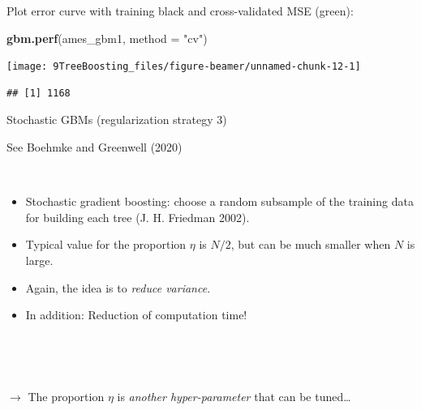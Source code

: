 \documentclass[
  10pt,
  ignorenonframetext,
]{beamer}
\newenvironment{Shaded}{\begin{snugshade}}{\end{snugshade}}
\newcommand{\AttributeTok}[1]{\textcolor[rgb]{0.13,0.29,0.53}{#1}}
\newcommand{\FunctionTok}[1]{\textcolor[rgb]{0.13,0.29,0.53}{\textbf{#1}}}
\newcommand{\NormalTok}[1]{#1}
\newcommand{\StringTok}[1]{\textcolor[rgb]{0.31,0.60,0.02}{#1}}
\providecommand{\tightlist}{%
  \setlength{\itemsep}{0pt}\setlength{\parskip}{0pt}}
\begin{document}
\begin{frame}[fragile]
Plot error curve with training black and cross-validated MSE (green):

\vspace{2mm}

\scriptsize

\begin{Shaded}
\begin{Highlighting}[]
\FunctionTok{gbm.perf}\NormalTok{(ames\_gbm1, }\AttributeTok{method =} \StringTok{"cv"}\NormalTok{)}
\end{Highlighting}
\end{Shaded}

\begin{center}\texttt{[image: 9TreeBoosting\_files/figure-beamer/unnamed-chunk-12-1]} \end{center}

\begin{verbatim}
## [1] 1168
\end{verbatim}
\end{frame}

\begin{frame}
\begin{block}{Stochastic GBMs (regularization strategy 3)}
\label{stochastic-gbms-regularization-strategy-3}
\scriptsize

See Boehmke and Greenwell (2020)

\(~\) \normalsize

\begin{itemize}
\tightlist
\item
  Stochastic gradient boosting: choose a random subsample of the
  training data for building each tree (J. H. Friedman 2002).
\end{itemize}

\vspace{2mm}

\begin{itemize}
\tightlist
\item
  Typical value for the proportion \(\eta\) is \(N/2\), but can be much
  smaller when \(N\) is large.
\end{itemize}

\vspace{2mm}

\begin{itemize}
\tightlist
\item
  Again, the idea is to \emph{reduce variance}.
\end{itemize}

\vspace{2mm}

\begin{itemize}
\tightlist
\item
  In addition: Reduction of computation time!
\end{itemize}

\(~\)

\(~\)

\(\rightarrow\) The proportion \(\eta\) is \emph{another
hyper-parameter} that can be tuned\ldots{}
\end{block}
\end{frame}
\end{document}
